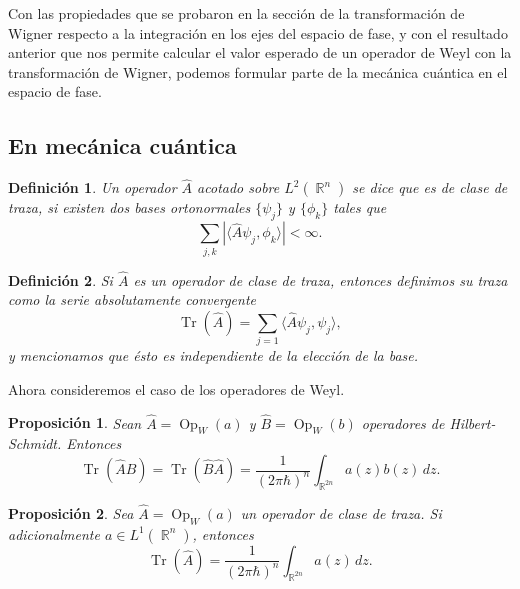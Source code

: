 \documentclass[a4paper]{report}
\DeclareMathOperator{\R}{\mathbb{R}}
\DeclareMathOperator{\Tr}{Tr}
\DeclareMathOperator{\Op}{Op}
\newtheorem{definition}{Definición}
\newtheorem{proposition}{Proposición}
\begin{document}
  Con las propiedades que se probaron en la sección de la
  transformación de Wigner respecto a la integración en los
  ejes del espacio de fase, y con el resultado anterior que
  nos permite calcular el valor esperado de un operador de
  Weyl con la transformación de Wigner, podemos formular
  parte de la mecánica cuántica en el espacio de fase.

  \subsection{En mecánica cuántica}

  \begin{definition}
    Un operador $\hat{A}$ acotado sobre $L^2(\R^{n})$ se
    dice que es de clase de traza, si existen dos bases
    ortonormales $\{\psi_j\}$ y $\{\phi_k\}$ tales que
    \begin{equation}
      \sum_{j,k}^{} \left|
      \langle \hat{A} \psi_j, \phi_k \rangle
      \right| < \infty.
    \end{equation}
  \end{definition}

  \begin{definition}
    Si $\hat{A}$ es un operador de clase de traza, entonces
    definimos su traza como la serie absolutamente
    convergente
    \begin{equation}
      \Tr\left( \hat{A} \right) 
      = \sum_{j=1}^{} \langle \hat{A}\psi_j, \psi_j \rangle,
    \end{equation}
    y mencionamos que ésto es independiente de la elección
    de la base.
  \end{definition}

  Ahora consideremos el caso de los operadores de Weyl.

  \begin{proposition}
    Sean $\hat{A} = \Op_W(a)$ y $\hat{B} = \Op_W(b)$
    operadores de Hilbert-Schmidt. Entonces
    \begin{equation}
      \Tr\left( \hat{A}\hat{B} \right) 
      = \Tr\left( \hat{B}\hat{A} \right) 
      = \frac{1}{(2\pi\hbar)^{n}} \int_{\R^{2n}} a(z)b(z) \,
      dz.
    \end{equation}
  \end{proposition}

  \begin{proposition}
    Sea $\hat{A} = \Op_W(a)$ un operador de clase de traza.
    Si adicionalmente $a \in L^{1}(\R^{n})$, entonces
    \begin{equation}
      \Tr\left( \hat{A} \right) 
      = \frac{1}{(2\pi\hbar)^{n}} \int_{\R^{2n}} a(z) \, dz.
    \end{equation}
  \end{proposition}
\end{document}
